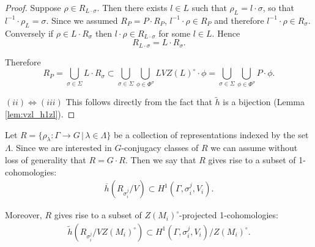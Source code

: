 \begin{proof}
  Suppose $\rho \in R_{L \cdot \sigma}$. Then there exists $l \in L$ such that $\rho_L = l \cdot \sigma$, so that $l^{-1} \cdot \rho_L = \sigma$. Since we assumed $R_P = P \cdot R_P$, $l^{-1} \cdot \rho \in R_P$ and therefore $l^{-1} \cdot \rho \in R_\sigma$. Conversely if $\rho \in L \cdot R_\sigma$ then $l \cdot \rho \in R_{L \cdot \sigma}$ for some $l \in L$. Hence
  \begin{displaymath}
    R_{L \cdot \sigma} = L \cdot R_\sigma.
  \end{displaymath}

  Therefore
  \begin{displaymath}
    R_P = \bigcup_{\sigma \in \Sigma} L \cdot R_\sigma \subset \bigcup_{\sigma \in \Sigma}\bigcup_{\phi \in \Phi^\sigma} LVZ(L)^\circ \cdot \phi = \bigcup_{\sigma \in \Sigma}\bigcup_{\phi \in \Phi^\sigma} P \cdot \phi.
  \end{displaymath}

  $(ii) \Leftrightarrow (iii)$ This follows directly from the fact that $\tilde{h}$ is a bijection (Lemma \ref{lem:vzl_h1zl}).

\end{proof}

Let $R = \{ \rho_\lambda: \Gamma \rightarrow G \,|\, \lambda \in \Lambda \}$ be a collection of representations indexed by the set $\Lambda$. Since we are interested in $G$-conjugacy classes of $R$ we can assume without loss of generality that $R = G \cdot R$. Then we say that $R$ gives rise to a subset of 1-cohomologies:
\begin{eqnarray}
  \overline{h}(R_{\sigma_i^j}/V) \subset H^1(\Gamma, \sigma_i^j, V_i).
  \label{eqn:rv_h}
\end{eqnarray}

Moreover, $R$ gives rise to a subset of $Z(M_i)^\circ$-projected 1-cohomologies:
\begin{eqnarray}
  \tilde{h}(R_{\sigma_i^j}/VZ(M_i)^\circ) \subset H^1(\Gamma, \sigma_i^j, V_i)/Z(M_i)^\circ.
  \label{eqn:rvz_hz}
\end{eqnarray}

